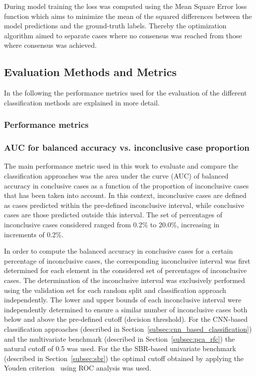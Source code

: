 During model training the loss was computed using the Mean Square Error loss function 
which aims to minimize the mean of the squared differences between the model predictions and the ground-truth labels.
Thereby the optimization algorithm aimed to separate cases where no consensus was reached from those where 
consensus was achieved.


\subsection{Evaluation Methods and Metrics}
\label{subsec:determinationInconcl}

In the following the performance metrics used for the evaluation of the different classification methods 
are explained in more detail.

\subsubsection{Performance metrics}
\label{subsubsec:}


\subsubsection{AUC for balanced accuracy vs. inconclusive case proportion}
\label{subsubsec:auc_bal_acc}


The main performance metric used in this work to evaluate and compare the classification approaches was 
the area under the curve (AUC) of balanced accuracy in conclusive cases as a function of the proportion of inconclusive cases
that has been taken into account. 
In this context, inconclusive cases are defined as cases predicted within the pre-defined inconclusive interval, 
while conclusive cases are those predicted outside this interval.
The set of percentages of inconclusive cases considered ranged from 0.2\% to 20.0\%, increasing in increments of 0.2\%.

In order to compute the balanced accuracy in conclusive cases for a certain percentage of inconclusive cases, 
the corresponding inconclusive interval was first determined 
for each element in the considered set of percentages of inconclusive cases.
The determination of the inconclusive interval was exclusively performed using the validation set 
for each random split and classification approach independently.
The lower and upper bounds of each inconclusive interval were independently determined
to ensure a similar number of inconclusive cases both below and above the pre-defined cutoff (decision threshold).
For the CNN-based classification approaches (described in Section~\ref{subsec:cnn_based_classification}) and the 
multivariate benchmark (described in Section~\ref{subsec:pca_rfc}) the natural cutoff of 0.5 was used.
For the the SBR-based univariate benchmark (described in Section~\ref{subsec:sbr}) the optimal cutoff 
obtained by applying the Youden criterion~\citep{Youden1950} using ROC analysis was used.



